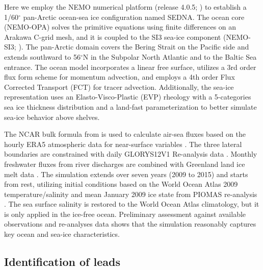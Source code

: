 \documentclass[lineno,sn-basic]{sn-jnl}%
\begin{document}
Here we employ the NEMO numerical platform (release 4.0.5; \citealp{NEMO_man}) to establish a 1/60$^\circ$ pan-Arctic ocean-sea ice configuration named SEDNA. The ocean core (NEMO-OPA) solves the primitive equations using finite differences on an Arakawa C-grid mesh, and it is coupled to the SI3 sea-ice component (NEMO-SI3; \citealp{SI3_man}). The pan-Arctic domain covers the Bering Strait on the Pacific side and extends southward to 56$^\circ$N in the Subpolar North Atlantic and to the Baltic Sea entrance. The ocean model incorporates a linear free surface, utilizes a 3rd order flux form scheme for momentum advection, and employs a 4th order Flux Corrected Transport (FCT) for tracer advection. Additionally, the sea-ice representation uses an Elasto-Visco-Plastic (EVP) rheology with a 5-categories sea ice thickness distribution and a land-fast parameterization to better simulate sea-ice behavior above shelves.

The NCAR bulk formula from \citet{Large_global_2009} is used to calculate air-sea fluxes based on the hourly ERA5 atmospheric data for near-surface variables \citep{Hersbach_ERA5_2020}. The three lateral boundaries are constrained with daily GLORYS12V1 Re-analysis data \citep{GLORYS12}. Monthly freshwater fluxes from river discharges are combined with Greenland land ice melt data \citep{HuEA_rivers_2019}. The simulation extends over seven years (2009 to 2015) and starts from rest, utilizing initial conditions based on the World Ocean Atlas 2009 temperature/salinity and mean January 2009 ice state from PIOMAS re-analysis \citep{Locarnini_data_2010, PIOMAS}. The sea surface salinity is restored to the World Ocean Atlas climatology, but it is only applied in the ice-free ocean. Preliminary assessment against available observations and re-analyses data shows that the simulation reasonably captures key ocean and sea-ice characteristics.


\subsection*{Identification of leads}
\end{document}
